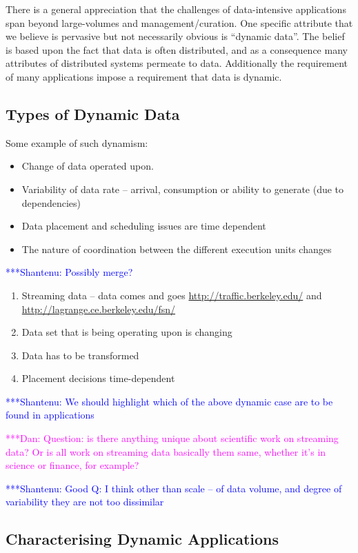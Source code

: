 \documentclass[preprint,12pt]{article}
\newcommand{\katznote}[1]{ {\textcolor{magenta}    { ***Dan:      #1 }}}
\newcommand{\jhanote}[1]{  {\textcolor{blue}     { ***Shantenu: #1 }}}
\newcommand{\katznote}[1]{}
\newcommand{\jhanote}[1]{}
\begin{document}
There is a general appreciation that the challenges of data-intensive
applications span beyond large-volumes and management/curation.  One
specific attribute that we believe is pervasive but not necessarily
obvious is “dynamic data”. The belief is based upon the fact that data
is often distributed, and as a consequence many attributes of
distributed systems permeate to data. Additionally the requirement of
many applications impose a requirement that data is dynamic.

\subsection{Types of Dynamic Data}
Some example of such dynamism:

\begin{itemize}
\item Change of data operated upon.
\item Variability of data rate -- arrival, consumption or ability to generate (due to dependencies)
\item Data placement and scheduling issues are time dependent
\item The nature of coordination between the different execution units
changes
\end{itemize}

\jhanote{Possibly merge?}

\begin{enumerate}

\item Streaming data -- data comes and goes
  \url{http://traffic.berkeley.edu/} and
  \url{http://lagrange.ce.berkeley.edu/fsn/}
\item Data set that is being operating upon is changing
\item Data has to be transformed
\item Placement decisions time-dependent
\end{enumerate}

\jhanote{We should highlight which of the above dynamic case are to be
  found in applications}

\katznote{Question: is there anything unique about scientific work on
  streaming data?  Or is all work on streaming data basically them
  same, whether it's in science or finance, for example?}

\jhanote{Good Q: I think other than scale -- of data volume, and
  degree of variability they are not too dissimilar}

\subsection{Characterising Dynamic Applications}
\end{document}
